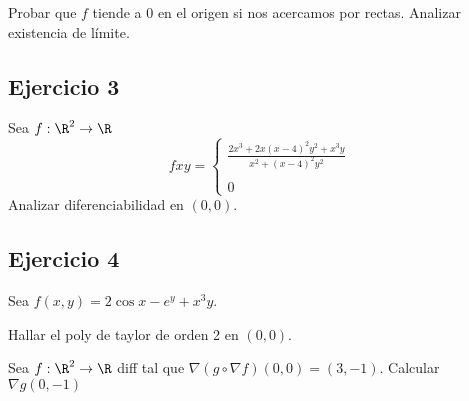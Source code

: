 \documentclass{article}
\begin{document}
Probar que $f$ tiende a $0$ en el origen si nos acercamos por rectas.
Analizar existencia de límite.

\subsection*{Ejercicio 3}
Sea $f : \R^2 \to \R$
\[
	f xy = 
	\begin{cases}
		\frac{2x^3 + 2x(x-4)^2y^2 + x^3y}{x^2 + (x-4)^2y^2}  \\
		\\
		0
	\end{cases}
\]
Analizar diferenciabilidad en $(0,0)$.
\subsection*{Ejercicio 4}
Sea $f(x,y) = 2\cos x - e^y + x^3y$.

Hallar el poly de taylor de orden 2 en $(0,0)$.

Sea $f : \R^2 \to \R$ diff tal que $\nabla(g \circ \nabla f)(0,0) = (3,-1)$. Calcular $\nabla g (0,-1)$
\end{document}
